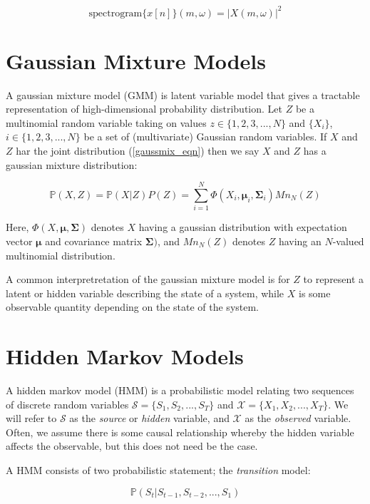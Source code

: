 \documentclass[11pt, oneside, a4paper]{report}
\begin{document}
\begin{equation}\label{spectrogram}
  \text{spectrogram}\{x[n]\}(m,\omega) = |X(m,\omega)|^2 
\end{equation}


\section{Gaussian Mixture Models}\label{gmm_appendix}
A gaussian mixture model (GMM) is latent variable model that gives a
tractable representation of high-dimensional probability
distribution. Let $Z$ be a multinomial random variable taking on
values $z \in \{1,2,3,...,N\}$ and $\{X_i\}$, $i \in \{1,2,3,...,N\}$
be a set of (multivariate) Gaussian random variables. If $X$ and $Z$
har the joint distribution (\ref{gaussmix_eqn}) then we say $X$ and $Z$
has a gaussian mixture distribution:

\begin{equation}\label{gaussmix_eqn}
  \mathbb{P}(X,Z) = \mathbb{P}(X|Z)P(Z) = \sum_{i = 1}^N
  \Phi(X_i,\mathbf{\mu}_i, \mathbf{\Sigma}_i)Mn_N(Z)
\end{equation}

Here, $\Phi(X,\mathbf{\mu}, \mathbf{\Sigma})$ denotes $X$ having a
gaussian distribution with expectation vector $\mathbf{\mu}$ and
covariance matrix $\mathbf{\Sigma})$, and $Mn_N(Z)$ denotes $Z$ having
an $N$-valued multinomial distribution.

A common interpretretation of the gaussian mixture model is for $Z$ to
represent a latent or hidden variable describing the state of a
system, while $X$ is some observable quantity depending on the state
of the system. 


\section{Hidden Markov Models}\label{hmm_appendix}
A hidden markov model (HMM) is a probabilistic model relating two sequences of
discrete random variables $\mathcal{S} = \{S_1, S_2, ..., S_T\}$ and
$\mathcal{X} = \{X_1, X_2, ..., X_T\}$. We will refer to
$\mathcal{S}$ as the \emph{source} or \emph{hidden} variable, and
$\mathcal{X}$ as the \emph{observed} variable. Often, we assume there
is some causal relationship whereby the hidden variable affects the
observable, but this does not need be the case. 

A HMM consists of two probabilistic statement; the \emph{transition}
model:

\begin{equation}
\mathbb{P}(S_t|S_{t-1}, S_{t-2},...,S_1)
\end{equation}
\end{document}
